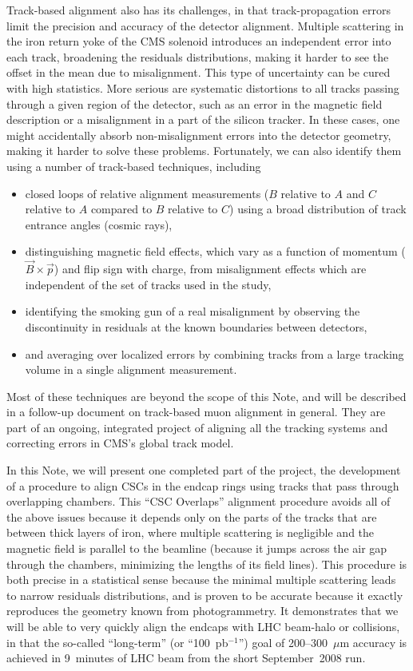 \documentclass[12pt]{article}
\begin{document}
Track-based alignment also has its challenges, in that
track-propagation errors limit the precision and accuracy of the
detector alignment.  Multiple scattering in the iron return yoke of
the CMS solenoid introduces an independent error into each track,
broadening the residuals distributions, making it harder to see the
offset in the mean due to misalignment.  This type of uncertainty can
be cured with high statistics.  More serious are systematic
distortions to all tracks passing through a given region of the
detector, such as an error in the magnetic field description or a
misalignment in a part of the silicon tracker.  In these cases, one
might accidentally absorb non-misalignment errors into the detector
geometry, making it harder to solve these problems.  Fortunately, we
can also identify them using a number of track-based techniques,
including
\begin{itemize}
\item closed loops of relative alignment measurements ($B$ relative to
  $A$ and $C$ relative to $A$ compared to $B$ relative to $C$) using
  a broad distribution of track entrance angles (cosmic rays),
\item distinguishing magnetic field effects, which vary as a function
  of momentum ($\vec{B}\times\vec{p}$) and flip sign with charge, from
  misalignment effects which are independent of the set of tracks
  used in the study,
\item identifying the smoking gun of a real misalignment by observing
  the discontinuity in residuals at the known boundaries between detectors,
\item and averaging over localized errors by combining tracks from a
  large tracking volume in a single alignment measurement.
\end{itemize}
Most of these techniques are beyond the scope of this Note, and will
be described in a follow-up document on track-based muon alignment in
general.  They are part of an ongoing, integrated project of aligning
all the tracking systems and correcting errors in CMS's global track
model.

In this Note, we will present one completed part of the project, the
development of a procedure to align CSCs in the endcap rings using
tracks that pass through overlapping chambers.  This ``CSC Overlaps''
alignment procedure avoids all of the above issues because it depends
only on the parts of the tracks that are between thick layers of iron,
where multiple scattering is negligible and the magnetic field is
parallel to the beamline (because it jumps across the air gap through
the chambers, minimizing the lengths of its field lines).  This
procedure is both precise in a statistical sense because the minimal
multiple scattering leads to narrow residuals distributions, and is
proven to be accurate because it exactly reproduces the geometry known
from photogrammetry.  It demonstrates that we will be able to very
quickly align the endcaps with LHC beam-halo or collisions, in that
the so-called ``long-term'' (or ``100~pb$^{-1}$'') goal of
200--300~$\mu$m accuracy is achieved in 9~minutes of LHC beam from the
short September~2008 run.
\end{document}
